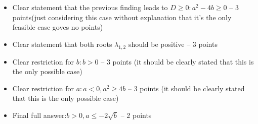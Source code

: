 \begin{enumerate}
\begin{itemize}
        \item Clear statement that the previous finding leads to $D \geq 0\colon a^2 - 4b \geq 0$ -- 3 points(just considering this case without explanation that it's the only feasible case goves no points) 
        \item Clear statement that both roots $\lambda_{1,2}$ should be positive -- 3 points
        \item Clear restriction for $b\colon b > 0$ -- 3 points (it should be clearly stated that this is the only possible case)
        \item Clear restriction for $a\colon a <0, a^2 \geq 4b$ -- 3 points (it should be clearly stated that this is the only possible case)
        \item Final full answer:$b>0, a\leq -2\sqrt{b}$ -- 2 points
    \end{itemize}
\end{enumerate}
